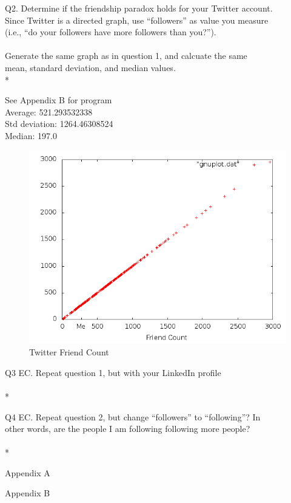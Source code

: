 \documentclass{article}
\begin{document}
Q2. Determine if the friendship paradox holds for your Twitter account.\\
Since Twitter is a directed graph, use ``followers'' as value you measure\\
(i.e., ``do your followers have more followers than you?'').\\
\\
Generate the same graph as in question 1, and calcuate the same \\
mean, standard deviation, and median values.\\*

See Appendix B for program\\
Average: 521.293532338\\
Std deviation: 1264.46308524\\
Median: 197.0\\
\graphicspath{{q2/}}
\begin{figure}[H]
  \centering
  \caption{Twitter Friend Count}
  \includegraphics[scale=.45]{scatter.png}
\end{figure}
\clearpage

Q3 EC. Repeat question 1, but with your LinkedIn profile\\
\\*

Q4 EC. Repeat question 2, but change ``followers'' to ``following''?  In\\
other words, are the people I am following following more people?\\
\\*

\appendix
\newpage
Appendix A


\newpage
Appendix B

\end{document}
